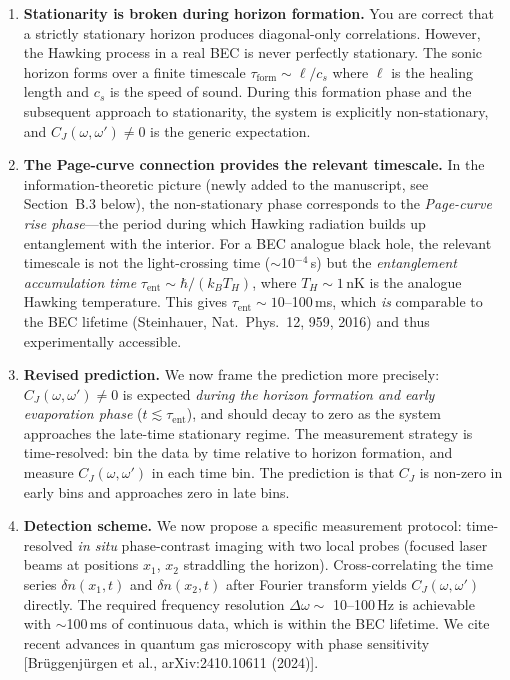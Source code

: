 \documentclass[11pt,a4paper]{article}
\begin{document}
\begin{enumerate}[leftmargin=*]
\item \textbf{Stationarity is broken during horizon formation.} You are correct that a strictly stationary horizon produces diagonal-only correlations. However, the Hawking process in a real BEC is never perfectly stationary. The sonic horizon forms over a finite timescale $\tau_{\text{form}} \sim \ell/c_s$ where $\ell$ is the healing length and $c_s$ is the speed of sound. During this formation phase and the subsequent approach to stationarity, the system is explicitly non-stationary, and $C_J(\omega, \omega') \neq 0$ is the generic expectation.

\item \textbf{The Page-curve connection provides the relevant timescale.} In the information-theoretic picture (newly added to the manuscript, see Section~B.3 below), the non-stationary phase corresponds to the \emph{Page-curve rise phase}---the period during which Hawking radiation builds up entanglement with the interior. For a BEC analogue black hole, the relevant timescale is not the light-crossing time ($\sim$10$^{-4}$\,s) but the \emph{entanglement accumulation time} $\tau_{\text{ent}} \sim \hbar / (k_B T_H)$, where $T_H \sim 1$\,nK is the analogue Hawking temperature. This gives $\tau_{\text{ent}} \sim 10$--100\,ms, which \emph{is} comparable to the BEC lifetime (Steinhauer, Nat.\ Phys.\ 12, 959, 2016) and thus experimentally accessible.

\item \textbf{Revised prediction.} We now frame the prediction more precisely: $C_J(\omega, \omega') \neq 0$ is expected \emph{during the horizon formation and early evaporation phase} ($t \lesssim \tau_{\text{ent}}$), and should decay to zero as the system approaches the late-time stationary regime. The measurement strategy is time-resolved: bin the data by time relative to horizon formation, and measure $C_J(\omega, \omega')$ in each time bin. The prediction is that $C_J$ is non-zero in early bins and approaches zero in late bins.

\item \textbf{Detection scheme.} We now propose a specific measurement protocol: time-resolved \emph{in situ} phase-contrast imaging with two local probes (focused laser beams at positions $x_1$, $x_2$ straddling the horizon). Cross-correlating the time series $\delta n(x_1, t)$ and $\delta n(x_2, t)$ after Fourier transform yields $C_J(\omega, \omega')$ directly. The required frequency resolution $\Delta\omega \sim$ 10--100\,Hz is achievable with $\sim$100\,ms of continuous data, which is within the BEC lifetime. We cite recent advances in quantum gas microscopy with phase sensitivity [Br\"uggenj\"urgen et al., arXiv:2410.10611 (2024)].


\end{enumerate}
\end{document}

